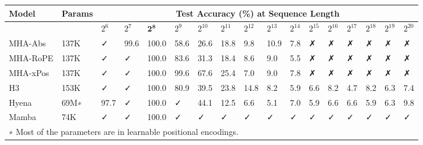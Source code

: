 \begin{tabular}{lllllllllllllllll}
\hline
Model & Params & \multicolumn{15}{c}{Test Accuracy (\%) at Sequence Length} \\
\hline
 &  & $2^{6}$ & $2^{7}$ & $\bm{2^{8}}$ & $2^{9}$ & $2^{10}$ & $2^{11}$ & $2^{12}$ & $2^{13}$ & $2^{14}$ & $2^{15}$ & $2^{16}$ & $2^{17}$ & $2^{18}$ & $2^{19}$ & $2^{20}$ \\
\hline
MHA-Abs & 137K & ✓ & 99.6 & 100.0 & 58.6 & 26.6 & 18.8 & 9.8 & 10.9 & 7.8 & ✗ & ✗ & ✗ & ✗ & ✗ & ✗ \\
MHA-RoPE & 137K & ✓ & ✓ & 100.0 & 83.6 & 31.3 & 18.4 & 8.6 & 9.0 & 5.5 & ✗ & ✗ & ✗ & ✗ & ✗ & ✗ \\
MHA-xPos & 137K & ✓ & ✓ & 100.0 & 99.6 & 67.6 & 25.4 & 7.0 & 9.0 & 7.8 & ✗ & ✗ & ✗ & ✗ & ✗ & ✗ \\
H3 & 153K & ✓ & ✓ & 100.0 & 80.9 & 39.5 & 23.8 & 14.8 & 8.2 & 5.9 & 6.6 & 8.2 & 4.7 & 8.2 & 6.3 & 7.4 \\
Hyena & 69M∗ & 97.7 & ✓ & 100.0 & ✓ & 44.1 & 12.5 & 6.6 & 5.1 & 7.0 & 5.9 & 6.6 & 6.6 & 5.9 & 6.3 & 9.8 \\
Mamba & 74K & ✓ & ✓ & 100.0 & ✓ & ✓ & ✓ & ✓ & ✓ & ✓ & ✓ & ✓ & ✓ & ✓ & ✓ & ✓ \\
\hline
\multicolumn{17}{l}{∗ Most of the parameters are in learnable positional encodings.} \\
\end{tabular}
